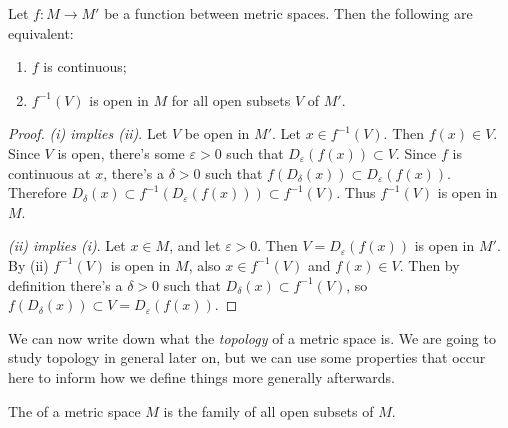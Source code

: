 \documentclass[a4paper]{scrartcl}
\begin{document}
\begin{proposition}
    Let $f: M \rightarrow M'$ be a function between metric spaces. Then the following are equivalent:
    \begin{enumerate}[label=(\roman*)]
        \item $f$ is continuous;
        \item $f^{-1}(V)$ is open in $M$ for all open subsets $V$ of $M'$.
    \end{enumerate}
\end{proposition}
\begin{proof}
    \emph{(i) implies (ii)}. Let $V$ be open in $M'$. Let $x \in f^{-1}(V)$. Then $f(x) \in V$. Since $V$ is open, there's some $\varepsilon > 0$ such that $D_{\varepsilon}(f(x)) \subset V$. Since $f$ is continuous at $x$, there's a $\delta > 0$ such that $f(D_{\delta}(x)) \subset D_{\varepsilon}(f(x))$. Therefore $D_{\delta}(x) \subset f^{-1}(D_\varepsilon (f(x))) \subset f^{-1}(V)$. Thus $f^{-1}(V)$ is open in $M$.

    \emph{(ii) implies (i)}. Let $x \in M$, and let $\varepsilon > 0$. Then $V = D_{\varepsilon}(f(x))$ is open in $M'$. By (ii) $f^{-1}(V)$ is open in $M$, also $x \in f^{-1}(V)$ and $f(x) \in V$. Then by definition there's a $\delta > 0$ such that $D_{\delta}(x) \subset f^{-1}(V)$, so $f(D_{\delta}(x)) \subset V = D_\varepsilon(f(x))$.
\end{proof}

We can now write down what the \emph{topology} of a metric space is. We are going to study topology in general later on, but we can use some properties that occur here to inform how we define things more generally afterwards.

\begin{definition}
    The  of a metric space $M$ is the family of all open subsets of $M$.
\end{definition}
\end{document}
